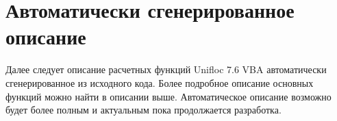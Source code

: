 \documentclass[a4paper,14pt,oneside,openany]{memoir}
\newcommand{\unf}{Unifloc 7.6 VBA }
\begin{document}
	

	
\appendix
\setlength{\midchapskip}{20pt}
\renewcommand*{\afterchapternum}{\par\nobreak\vskip \midchapskip}
\renewcommand\thechapter{\Asbuk{chapter}} %
	
	

\chapter{Автоматически сгенерированное описание}

Далее следует описание расчетных функций \unf автоматически сгенерированное из исходного кода.
Более подробное описание основных функций можно найти в описании выше. Автоматическое описание возможно будет более полным и актуальным пока продолжается разработка.


	
\end{document}
